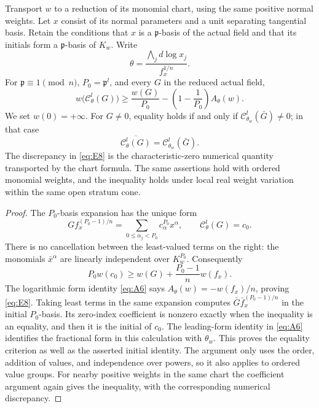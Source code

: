 \begin{lemma}\label{c:trace-initial-survival}
Transport $w$ to a reduction of its monomial chart, using the same positive
normal weights.  Let $x$ consist of its normal parameters and a unit
separating tangential basis.  Retain the conditions that $x$ is a $\mathfrak p$-basis
of the actual field and that its initials form a $\mathfrak p$-basis of $K_w$.
Write
\[
 \theta=\frac{\bigwedge_jd\log x_j}{f_x^{1/n}}.
\]
For $\mathfrak p\equiv1\pmod n$, $P_0=\mathfrak p^l$, and every $G$ in the reduced actual
field,
\begin{equation}\label{eq:E8}
 w\bigl(\mathcal C^l_\theta(G)\bigr)
 \ge \frac{w(G)}{P_0}
      -\left(1-\frac1{P_0}\right)A_\theta(w).
\end{equation}
We set $w(0)=+\infty$.  For $G\ne0$, equality holds if and only if
$\mathcal C^l_{\theta_w}(\bar G)\ne0$; in that case
\[
 \overline{\mathcal C^l_\theta(G)}
       =\mathcal C^l_{\theta_w}(\bar G).
\]
The discrepancy in \eqref{eq:E8} is the characteristic-zero numerical
quantity transported by the chart formula.  The same assertions hold
with ordered monomial weights, and the inequality holds under local real
weight variation within the same open stratum cone.
\end{lemma}

\begin{proof}
The $P_0$-basis expansion has the unique form
\[
 Gf_x^{(P_0-1)/n}
   =\sum_{0\le\alpha_j<P_0}c_\alpha^{P_0}x^\alpha,
 \qquad \mathcal C^l_\theta(G)=c_0.
\]
There is no cancellation between the least-valued terms on the right:
the monomials $\bar x^\alpha$ are linearly independent over $K_w^{P_0}$.
Consequently
\[
 P_0w(c_0)\ge w(G)+\frac{P_0-1}{n}w(f_x).
\]
The logarithmic form identity \eqref{eq:A6} says
$A_\theta(w)=-w(f_x)/n$, proving \eqref{eq:E8}.
Taking least terms in the same expansion computes
$\bar G\bar f_x^{(P_0-1)/n}$ in the initial $P_0$-basis.  Its zero-index
coefficient is nonzero exactly when the inequality is an equality, and
then it is the initial of $c_0$.  The leading-form identity in
\eqref{eq:A6} identifies the fractional form in this calculation with
$\theta_w$.  This proves the equality criterion as well as the asserted
initial identity.  The argument only uses the order, addition of values,
and independence over powers, so it also applies to ordered value groups.
For nearby positive weights in the same chart the coefficient argument
again gives the inequality, with the corresponding numerical discrepancy.
\end{proof}

